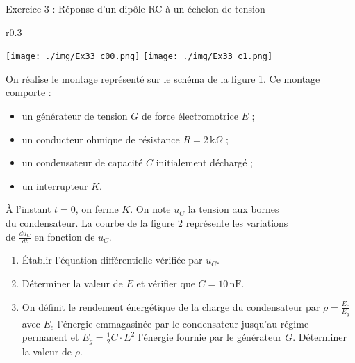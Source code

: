 \documentclass[12pt, french]{article}
\begin{document}
\begin{Box2}{Exercice 3 : Réponse d’un dipôle RC à un échelon de tension }

	\begin{wrapfigure}[5]{r}{0.3\textwidth}
		\begin{center}
			\vspace{-0.6cm}
			\texttt{[image: ./img/Ex33\_c00.png]}
			\texttt{[image: ./img/Ex33\_c1.png]}
		\end{center}
	\end{wrapfigure}



	On réalise le montage représenté sur le schéma de la figure 1. Ce montage comporte :
	\begin{itemize}
		\item un générateur de tension \( G \) de force électromotrice \( E \) ;
		\item un conducteur ohmique de résistance \( R = 2 \, \text{k}\Omega \) ;
		\item un condensateur de capacité \( C \) initialement déchargé ;
		\item un interrupteur \( K \).
	\end{itemize}

	À l’instant \( t = 0 \), on ferme \( K \). On note \( u_C \) la tension aux bornes \\du condensateur. La courbe de la figure 2 représente les variations \\de \( \frac{du_C}{dt} \) en fonction de \( u_C \).
	\begin{enumerate}
		\item Établir l’équation différentielle vérifiée par \( u_C \).
		\item Déterminer la valeur de \( E \) et vérifier que \( C = 10 \, \text{nF} \).
		\item On définit le rendement énergétique de la charge du condensateur par
		      $
			      \rho = \frac{E_e}{E_g}$
		      avec \( E_e \) l’énergie emmagasinée par le condensateur jusqu’au régime permanent et \( E_g = \frac{1}{2}C \cdot E^2 \) l’énergie fournie par le générateur \( G \). Déterminer la valeur de \( \rho \).
	\end{enumerate}


\end{Box2}
\end{document}
